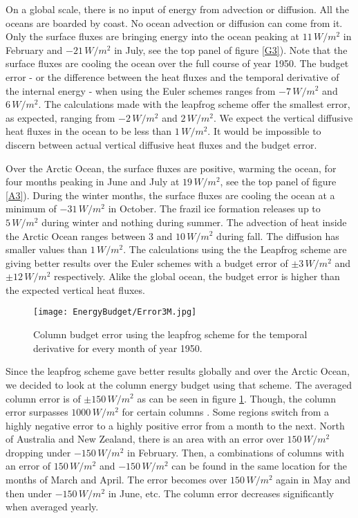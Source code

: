 On a global scale, there is no input of energy from advection or diffusion. All the oceans are boarded by coast. No ocean advection or diffusion can come from it. Only the surface fluxes are bringing energy into the ocean peaking at $11 \, W/m^2$ in February and $-21 \, W/m^2$ in July, see the top panel of figure \ref{G3}). Note that the surface fluxes are cooling the ocean over the full course of year 1950. The budget error - or the difference between the heat fluxes and the temporal derivative of the internal energy  -  when using the Euler schemes ranges from $-7\, W/m^2$ and $6\, W/m^2$. The calculations made with the leapfrog scheme offer the smallest error, as expected, ranging from $-2\,W/m^2$ and $2\,W/m^2$. We expect the vertical diffusive heat fluxes in the ocean to be less than $1\,W/m^2$. It would be impossible to discern between actual vertical diffusive heat fluxes and the budget error. 

Over the Arctic Ocean, the surface fluxes are positive, warming the ocean, for four months peaking in June and July at $19 \, W/m^2$, see the top panel of figure \ref{A3}). During the winter months, the surface fluxes are cooling the ocean at a minimum of $-31 \, W/m^2$ in October. The frazil ice formation releases up to $5 \, W/m^2$ during winter and nothing during summer. The advection of heat inside the Arctic Ocean ranges between $3$ and $10 \, W/m^2$ during fall. The diffusion has smaller values than $1 \, W/m^2$. The calculations using the the Leapfrog scheme are giving better results over the Euler schemes with a budget error of $\pm 3 \, W/m^2$ and $\pm 12 \, W/m^2$ respectively. Alike the global ocean, the budget error is higher than the expected vertical heat fluxes. 

\begin{figure}[t!]
\center
\texttt{[image: EnergyBudget/Error3M.jpg]}
\caption{Column budget error using the leapfrog scheme for the temporal derivative for every month of year 1950.}
\label{C3}
\end{figure}

Since the leapfrog scheme gave better results globally and over the Arctic Ocean, we decided to look at the column energy budget using that scheme. The averaged column error is of $\pm 150 \, W/m^2$ as can be seen in figure \ref{C3}. Though, the column error surpasses $1000 \, W/m^2$ for certain columns . Some regions switch from a highly negative error to a highly positive error from a month to the next. North of Australia and New Zealand, there is an area with an error over $150\,W/m^2$ dropping under $-150\,W/m^2$ in February. Then, a combinations of columns with an error of $150\,W/m^2$ and $-150\,W/m^2$ can be found in the same location for the months of March and April. The error becomes over $150\,W/m^2$  again in May and then under $-150\,W/m^2$ in June, etc. The column error decreases significantly when averaged yearly. 

